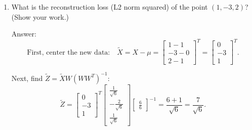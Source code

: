 \documentclass{article}
\newcommand{\blu}[1]{{\textcolor{blu}{#1}}}
\newenvironment{answer}{\par\begingroup\color{gre}Answer: }{\endgroup}
\let\ask\blu
\begin{document}
\begin{enumerate}
\begin{answer}
Next, find \(\tilde{Z} = \tilde{X} W^T (W W^T)^{-1}\):
\[
\tilde{Z} =
\begin{bmatrix}
1.5 \\
-3 \\
1.5
\end{bmatrix}^T
\begin{bmatrix}
\frac{1}{\sqrt{6}} \\
-\frac{2}{\sqrt{6}} \\
\frac{1}{\sqrt{6}}
\end{bmatrix}
\begin{bmatrix}
\frac{6}{6}
\end{bmatrix}^{-1}
=
\frac{1.5 + 6 + 1.5}{\sqrt{6}}
=
\frac{9}{\sqrt{6}}.
\]

Then, plug it into reconstruction loss:
\[
\| \tilde{Z} W - \tilde{X} \|_F^2 = \left\|
\frac{9}{\sqrt{6}\sqrt{6}}
\begin{bmatrix}
1 & -2 & 1
\end{bmatrix}
-
\begin{bmatrix}
1.5 & -3 & 1.5
\end{bmatrix}
\right\|_F^2
\]

\[
= \left\|
\begin{bmatrix}
\frac{9}{6} - 1.5 \\
-\frac{18}{6} + 3 \\
\frac{9}{6} - 1.5
\end{bmatrix}
\right\|_F^2
= 2 
\left(\frac{9}{6} - 1.5\right)^2 + \left(-\frac{18}{6} + 3\right)^2) = 0.
\]


\end{answer}
  
  \item \ask{What is the reconstruction loss (L2 norm squared) of the point $(1, -3, 2)$? (Show your work.)}

\begin{answer}
\[
\text{First, center the new data:} \quad \tilde{X} = X - \mu =
\begin{bmatrix}
1 - 1 \\
-3 - 0 \\
2 - 1
\end{bmatrix}^T
=
\begin{bmatrix}
0 \\
-3 \\
1
\end{bmatrix}^T.
\]

Next, find \(\tilde{Z} = \tilde{X} W (W W^T)^{-1}\):
\[
\tilde{Z} =
\begin{bmatrix}
0 \\
-3 \\
1
\end{bmatrix}^T
\begin{bmatrix}
\frac{1}{\sqrt{6}} \\
-\frac{2}{\sqrt{6}} \\
\frac{1}{\sqrt{6}}
\end{bmatrix}
\begin{bmatrix}
\frac{6}{6}
\end{bmatrix}^{-1}
=
\frac{6 + 1}{\sqrt{6}}
=
\frac{7}{\sqrt{6}}.
\]


\end{answer}
\end{enumerate}
\end{document}
